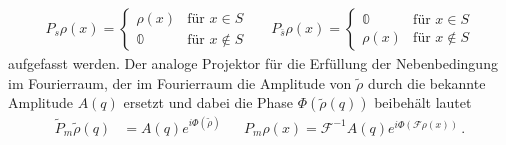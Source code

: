 \begin{align}
	P_s\rho (x)=\begin{cases}
	\rho (x)  &\text{für } x\in S\\
	\mathbb{0}  &\text{für }x\notin S
	\end{cases} &   &   
	P_{\bar{s}}\rho (x)=\begin{cases}
	\mathbb{0} &\text{für } x\in S\\
	\rho (x)   &\text{für }x\notin S
	\end{cases}
\end{align}
aufgefasst werden. Der analoge Projektor für die Erfüllung der Nebenbedingung im Fourierraum, der im Fourierraum die Amplitude von $\tilde{\rho}$ durch die bekannte Amplitude $A(q)$ ersetzt und dabei die Phase $\Phi\left(\tilde{\rho}\left(q\right)\right)$ beibehält lautet
\begin{align}
	\tilde{P}_m \tilde{\rho}(q) & =A(q)e^{i\Phi(\tilde{\rho})} &   & P_m\rho(x)=\mathscr{F}^{-1}A(q)e^{i\Phi\left(\mathscr{F}\rho\left(x\right)\right)} \,. 
\end{align}

